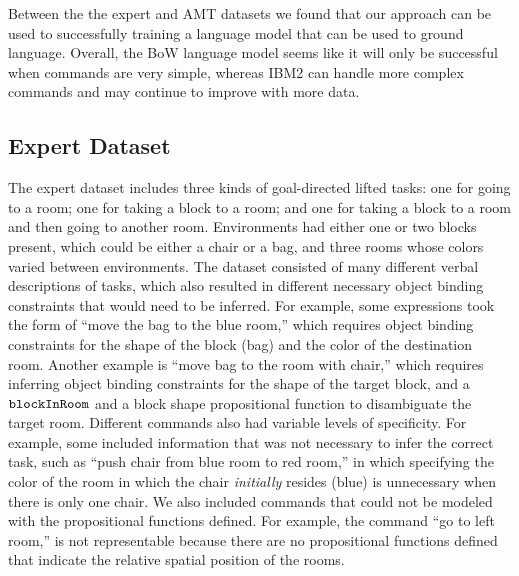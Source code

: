 \documentclass[conference]{IEEEtran}
\begin{document}
Between the the expert and AMT datasets we found that our approach can be used to successfully training a language model that can be used to ground language. Overall, the BoW language model seems like it will only be successful when commands are very simple, whereas IBM2 can handle more complex commands and may continue to improve with more data. %


\subsection{Expert Dataset}
The expert dataset includes three kinds of goal-directed lifted tasks: one for going to a room; one for taking a block to a room; and one for taking a block to a room and then going to another room. Environments had either one or two blocks present, which could be either a chair or a bag, and three rooms whose colors varied between environments. The dataset consisted of many different verbal descriptions of tasks, which also resulted in different necessary object binding constraints that would need to be inferred. For example, some expressions took the form of ``move the bag to the blue room,'' which requires object binding constraints for the shape of the block (bag) and the color of the destination room. Another example is ``move bag to the room with chair,'' which requires inferring object binding constraints for the shape of the target block, and a ${\tt blockInRoom}$ and a block shape propositional function to disambiguate the target room. Different commands also had variable levels of specificity. For example, some included information that was not necessary to infer the correct task, such as ``push chair from blue room to red room,'' in which specifying the color of the room in which the chair {\em initially} resides (blue) is unnecessary when there is only one chair. We also included commands that could not be modeled with the propositional functions defined. For example, the command ``go to left room,'' is not representable because there are no propositional functions defined that indicate the relative spatial position of the rooms.%
\end{document}

